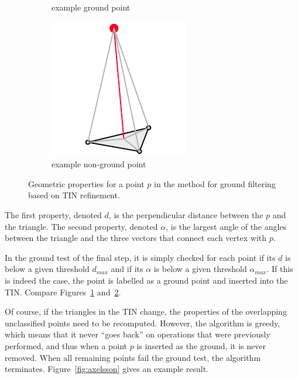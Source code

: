\begin{figure}
\begin{subfigure}[b]{0.3\linewidth}
    \caption{example ground point}
    \label{fig:ground-filtering:ground}
  \end{subfigure}
  \begin{subfigure}[b]{0.3\linewidth}
    \centering
    \includegraphics[width=\textwidth]{figs/groundfilter-nonground.pdf}
    \caption{example non-ground point}
    \label{fig:ground-filtering:nonground}
  \end{subfigure}
\caption{Geometric properties for a point $p$ in the method for ground filtering based on TIN refinement.}
\label{fig:ground-filtering}
\end{figure}
The first property, denoted $d$, is the perpendicular distance between the $p$ and the triangle.
The second property, denoted $\alpha$, is the largest angle of the angles between the triangle and the three vectors that connect each vertex with $p$. 

In the ground test of the final step, it is simply checked for each point if its $d$ is below a given threshold $d_{max}$ and if its $\alpha$ is below a given threshold $\alpha_{max}$.
If this is indeed the case, the point is labelled as a ground point and inserted into the TIN.
Compare Figures~\ref{fig:ground-filtering:ground} and~\ref{fig:ground-filtering:nonground}.

Of course, if the triangles in the TIN change, the properties of the overlapping unclassified points need to be recomputed. 
However, the algorithm is greedy, which means that it never ``goes back'' on operations that were previously performed, and thus  when a point $p$ is inserted as the ground, it is never removed.
When all remaining points fail the ground test, the algorithm terminates.
Figure~\ref{fig:axelsson} gives an example result.

